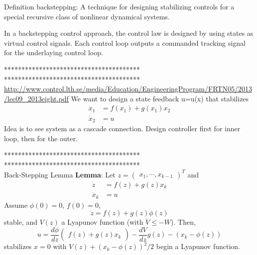 Definition backstepping: A technique for designing stabilizing controls for a special recursive class of nonlinear dynamical systems.

In a backstepping control approach, the control law is designed by using states as virtual control signals. Each control loop outputs a commanded tracking signal for the underlaying control loop.

***************************************\\


***************************************\\
\url{http://www.control.lth.se/media/Education/EngineeringProgram/FRTN05/2013/lec09_2013eight.pdf}
We want to design a state feedback u=u(x) that stabilizes
\begin{equation}\label{key}
\begin{aligned}
\dot{x}_1&=f(x_1)+g(x_1)x_2\\
\dot{x}_2&=u
\end{aligned}
\end{equation}
Idea is to see system as a cascade connection. Design controller first for inner loop, then for the outer.

***************************************\\


***************************************\\
Back-Stepping Lemma
\textbf{Lemma}: Let $ z=\begin{pmatrix}x_1,\cdots,x_{k-1}\end{pmatrix}^T$ and 
\begin{equation}\label{key}
\begin{aligned}
\dot{z}&=f(z)+g(z)x_k\\
\dot{x}_k&=u
\end{aligned}
\end{equation}
Assume $ \phi(0)=0 $, $ f(0)=0 $,
\begin{equation}\label{key}
\dot{z}=f(z)+g(z)\phi(z)
\end{equation}
stable, and $ V(z) $ a Lyapunov function (with $ \dot{V}\leq-W $). Then, 
\begin{equation}\label{key}
u=\frac{d\phi}{dz}\begin{pmatrix}
f(z)+g(z)x_k
\end{pmatrix}-\frac{dV}{dz}g(z)-(x_k-\phi(z))
\end{equation}
stabilizes $ x=0 $ with $ V(z)+(x_k-\phi(z))^2/2 $ begin a Lyapunov function.

